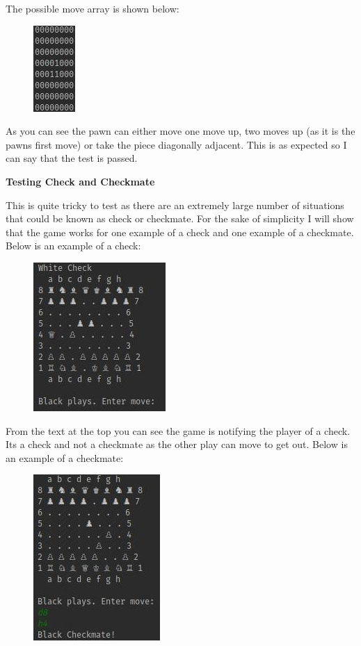 \documentclass[a4paper]{article}
\begin{document}
The possible move array is shown below:
\begin{figure}[H]
\centering
\includegraphics[scale=2.5]{pawnPosMoves}
\end{figure}
As you can see the pawn can either move one move up, two moves up (as it is the pawns first move) or take the piece diagonally adjacent. This is as expected so I can say that the test is passed. \newline

\noindent \textbf{Testing Check and Checkmate}

This is quite tricky to test as there are an extremely large number of situations that could be known as check or checkmate. For the sake of simplicity I will show that the game works for one example of a check and one example of a checkmate. Below is an example of a check: 
\begin{figure}[H]
\centering
\includegraphics[scale=2.5]{check}
\end{figure}

From the text at the top you can see the game is notifying the player of a check. Its a check and not a checkmate as the other play can move to get out. Below is an example of a checkmate:
\begin{figure}[H]
\centering
\includegraphics[scale=2.5]{checkMate}
\end{figure}
\end{document}
